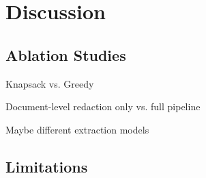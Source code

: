 \chapter{Discussion}\label{chapter:discussion}
\section{Ablation Studies}
Knapsack vs. Greedy 

Document-level redaction only vs. full pipeline 

Maybe different extraction models 
\section{Limitations}

